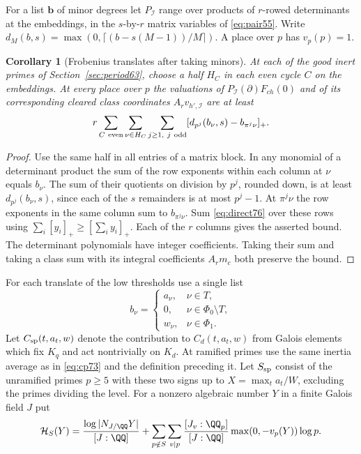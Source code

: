 \documentclass[a4paper,11pt]{article}
\newtheorem{corollary}[proposition]{Corollary}
\theoremstyle{definition}
\theoremstyle{remark}
\numberwithin{equation}{section}
\begin{document}
For a list \(\mathbf b\) of minor degrees let
\(P_{\mathcal I}\) range over products of \(r\)-rowed determinants
at the embeddings, in the \(s\)-by-\(r\) matrix variables of
\eqref{eq:pair55}. Write \(d_M(b,s)=
\max(0,\lceil(b-s(M-1))/M\rceil)\). A place over \(p\)
has \(v_p(p)=1\).

\begin{corollary}[Frobenius translates after taking minors]
\label{cor:minor77}
At each of the good inert primes of Section~\ref{sec:period63},
choose a half \(H_C\) in each even cycle \(C\) on the embeddings.
At every place over \(p\) the valuations of
\(P_{\mathcal I}(\partial)F_{ch}(0)\) and of its corresponding
cleared class coordinates \(A_r v_{h',\mathcal I}\) are at least
\begin{equation}
 r\sum_{C\ {\rm even}}\sum_{\nu\in H_C}\sum_{j\ge1,\ j\ {\rm odd}}
          [d_{p^j}(b_\nu,s)-b_{\pi^j\nu}]_+ .
 \label{eq:minor77}
\end{equation}
\end{corollary}
\begin{proof}
Use the same half in all entries of a matrix block. In any
monomial of a determinant product the sum of the row exponents
within each column at \(\nu\) equals \(b_\nu\). The sum of their
quotients on division by \(p^j\), rounded down, is at least
\(d_{p^j}(b_\nu,s)\), since each of the \(s\) remainders is at
most \(p^j-1\). At \(\pi^j\nu\) the row exponents in the same
column sum to \(b_{\pi^j\nu}\). Sum \eqref{eq:direct76} over
these rows using \(\sum_i[y_i]_+\ge[\sum_i y_i]_+\).
Each of the \(r\) columns gives the asserted bound. The
determinant polynomials have integer coefficients. Taking
their sum and taking a class sum with its integral coefficients
\(A_r m_c\) both preserve the bound.
\end{proof}

For each translate of the low thresholds use a single list
\begin{equation}
 b_\nu=
 \begin{cases}
      a_\nu,&\nu\in T,\\
      0,&\nu\in\Phi_0\setminus T,\\
      w_\nu,&\nu\in\Phi_1 .
 \end{cases}                                                   \label{eq:degrees77}
\end{equation}
Let \(C_{\rm sp}(t,a_t,w)\) denote the contribution to
\(C_d(t,a_t,w)\) from Galois elements which fix \(K_q\) and
act nontrivially on \(K_d\). At ramified primes use the same
inertia average as in \eqref{eq:cp73} and the definition
preceding it. Let \(S_{\rm sp}\) consist of the unramified
primes \(p\ge5\) with these two signs up to
\(X=\max_t a_t/W\), excluding the primes dividing the level.
For a nonzero algebraic number \(Y\) in a finite Galois field \(J\) put
\[
 \mathcal H_S(Y)=\frac{\log|N_{J/\QQ}Y|}{[J:\QQ]}
    +\sum_{p\notin S}\sum_{v\mid p}
        \frac{[J_v:\QQ_p]}{[J:\QQ]}
                 \max(0,-v_p(Y))\log p .
\]
\end{document}
